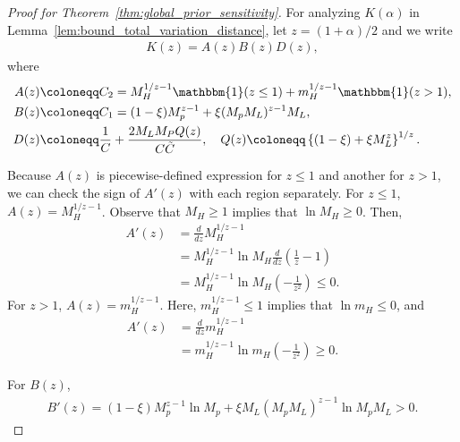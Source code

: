 \documentclass[12pt]{article}
\begin{document}
\begin{proof}[Proof for Theorem~\ref{thm:global_prior_sensitivity}]
    For analyzing $K(\alpha)$ in Lemma~\ref{lem:bound_total_variation_distance}, let $z = (1 + \alpha) / 2$ and we write
    \begin{align*}
        K(z) = A(z)B(z)D(z),
    \end{align*}
    where
    \begin{align*}
        A(z) &\coloneqq C_2 = M_H^{1/z - 1}\mathbbm{1}(z \leq 1) + m_H^{1/z - 1}\mathbbm{1}(z > 1), \\
        B(z) &\coloneqq C_1 = (1 - \xi)M_p^{z-1} + \xi (M_p M_L)^{z-1}M_L, \\
        D(z) &\coloneqq \frac{1}{C} + \frac{2 M_L M_P Q(z)}{C\tilde{C}}, \quad Q(z) \coloneqq \left\{(1 - \xi) + \xi M_L^z\right\}^{1/z}.
    \end{align*}

    Because $A(z)$ is piecewise-defined expression for $z \leq 1$ and another for $z > 1$, we can check the sign of $A'(z)$ with each region separately.
    For $z \leq 1$, $A(z) = M_H^{1/z - 1}$.
    Observe that $M_H \geq 1$ implies that $\ln M_H \geq 0$.
    Then,
    \begin{align*}
        A'(z) &= \frac{d}{dz}M_H^{1/z - 1} \\
        &= M_H^{1/z - 1} \ln M_H \frac{d}{dz}\left(\frac{1}{z} - 1\right) \\
        &= M_H^{1/z - 1} \ln M_H\left(-\frac{1}{z^2}\right) \leq 0.
    \end{align*}
    For $z > 1$, $A(z) = m_H^{1/z - 1}$.
    Here, $m_H^{1/z - 1} \leq 1$ implies that $\ln m_H \leq 0$, and
    \begin{align*}
        A'(z) &= \frac{d}{dz}m_H^{1/z - 1} \\
        &= m_H^{1/z - 1} \ln m_H\left(-\frac{1}{z^2}\right) \geq 0.
    \end{align*}

    For $B(z)$,
    \begin{align*}
        B'(z) = (1 - \xi) M_p^{z - 1} \ln M_p + \xi M_L (M_p M_L)^{z - 1} \ln M_p M_L > 0.
    \end{align*}


\end{proof}
\end{document}
